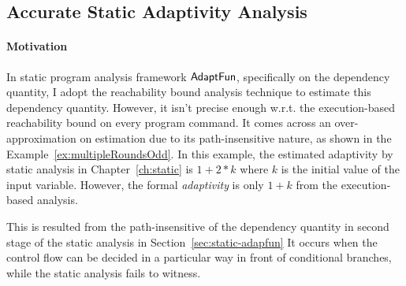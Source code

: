 \subsection{Accurate Static Adaptivity Analysis}
\label{sec:refine-static}

% 

\paragraph*{Motivation}
In static program analysis framework $\textsf{AdaptFun}$, specifically on the dependency quantity, 
I adopt the reachability bound analysis technique to estimate this dependency quantity.
However, it isn't precise enough w.r.t. the execution-based reachability bound on every program command.
It comes across an over-approximation on estimation due to its path-insensitive nature,
as shown in the Example~\ref{ex:multipleRoundsOdd}.
In this example, the estimated adaptivity by static analysis in Chapter~\ref{ch:static} 
is $1 + 2*k$ where $k$ is the initial value of the input variable.
However, the formal \emph{adaptivity} is only $1 + k$ from the execution-based analysis.

This is resulted from the  path-insensitive of the dependency quantity in
second stage of the static analysis in Section~\ref{sec:static-adapfun}
It occurs when the control flow can be decided in a particular way in front of conditional branches, 
while the static analysis fails to witness. 

